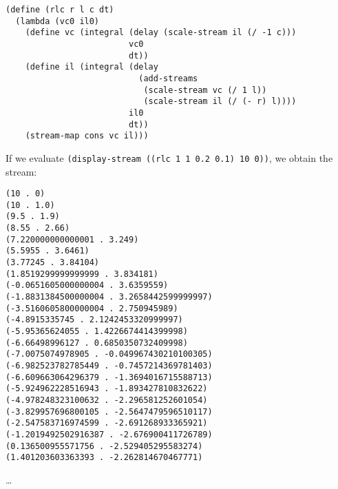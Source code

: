 \documentclass[a4paper,12pt]{article}
\begin{document}
\begin{lstlisting}
(define (rlc r l c dt)
  (lambda (vc0 il0)
    (define vc (integral (delay (scale-stream il (/ -1 c)))
                         vc0
                         dt))
    (define il (integral (delay
                           (add-streams
                            (scale-stream vc (/ 1 l))
                            (scale-stream il (/ (- r) l))))
                         il0
                         dt))
    (stream-map cons vc il)))
\end{lstlisting}
If we evaluate \lstinline!(display-stream ((rlc 1 1 0.2 0.1) 10 0))!,
we obtain the stream:
\begin{lstlisting}
(10 . 0)
(10 . 1.0)
(9.5 . 1.9)
(8.55 . 2.66)
(7.220000000000001 . 3.249)
(5.5955 . 3.6461)
(3.77245 . 3.84104)
(1.8519299999999999 . 3.834181)
(-0.0651605000000004 . 3.6359559)
(-1.8831384500000004 . 3.2658442599999997)
(-3.5160605800000004 . 2.750945989)
(-4.8915335745 . 2.1242453320999997)
(-5.95365624055 . 1.4226674414399998)
(-6.66498996127 . 0.6850350732409998)
(-7.0075074978905 . -0.049967430210100305)
(-6.982523782785449 . -0.7457214369781403)
(-6.609663064296379 . -1.3694016715588713)
(-5.924962228516943 . -1.893427810832622)
(-4.978248323100632 . -2.296581252601054)
(-3.829957696800105 . -2.5647479596510117)
(-2.547583716974599 . -2.691268933365921)
(-1.2019492502916387 . -2.676900411726789)
(0.136500955571756 . -2.529405295583274)
(1.401203603363393 . -2.262814670467771)
\end{lstlisting}
\ldots
\end{document}
